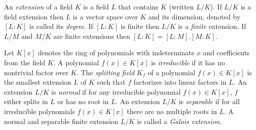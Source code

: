 \documentclass{article}
\newcommand{\Q}[0]{\ensuremath{\mathbb{Q}}}
\newcommand{\numP}{\mbox{\rm \#P}}
\begin{document}
%
%
%
%

An \emph{extension} of a field $K$ is a field $L$ that contains $K$
(written $L/K$). If $L/K$ is a field extension then $L$ is a vector
space over $K$ and its dimension, denoted by $[L:K]$ is called its
\emph{degree}.  If $[L : K]$ is finite then $L/K$ is a \emph{finite}
extension. If $L/M$ and $M/K$ are finite extensions then $[L:K] =
[L:M].[M:K]$.

Let $K[x]$ denotes the ring of polynomials with indeterminate $x$ and
coefficients from the field $K$. A polynomial $f(x) \in K[x]$ is
\emph{irreducible} if it has no nontrivial factor over $K$.  The
\emph{splitting field} $K_f$ of a polynomial $f(x) \in K[x]$ is the
smallest extension $L$ of $K$ such that $f$ factorizes into linear
factors in $L$. An extension $L/K$ is \emph{normal} if for any
irreducible polynomial $f(x) \in K[x]$, $f$ either splits in $L$ or
has no root in $L$. An extension $L/K$ is \emph{separable} if for all
irreducible polynomials $f(x) \in K[x]$ there are no multiple roots in
$L$.  A normal and separable finite extension $L/K$ is called a
\emph{Galois extension}.
\end{document}
